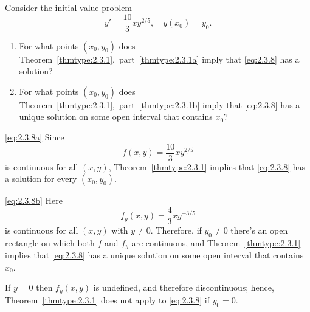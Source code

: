 \documentclass{ximera}
\begin{document}
\begin{example}\label{example:2.3.5}
Consider the initial value problem
\begin{equation} \label{eq:2.3.8}
y' = \frac{10}{3}xy^{2/5}, \quad y(x_0) = y_0.
\end{equation}
\begin{enumerate}
\item\label{eq:2.3.8a}
For what points $(x_0,y_0)$ does Theorem~\ref{thmtype:2.3.1},~part~\ref{thmtype:2.3.1a}
imply that
\eqref{eq:2.3.8} has a solution?

\item\label{eq:2.3.8b}
For what points $(x_0,y_0)$ does Theorem~\ref{thmtype:2.3.1},~part~\ref{thmtype:2.3.1b}
imply that
\eqref{eq:2.3.8} has a  unique solution on some open interval that contains
$x_0$?
\end{enumerate}

\begin{explanation}
\ref{eq:2.3.8a} Since
$$
f(x,y) = \frac{10}{3}xy^{2/5}
$$
is continuous for all $(x,y)$,  Theorem~\ref{thmtype:2.3.1}
implies that \eqref{eq:2.3.8} has a solution for every $(x_0,y_0)$.

\ref{eq:2.3.8b} Here
$$
f_y(x,y) = \frac{4}{3}xy^{-3/5}
$$
is continuous for all $(x,y)$ with $y\neq 0$. Therefore, if $y_0\neq0$
there's an open rectangle on which both $f$ and $f_y$ are
continuous, and Theorem~\ref{thmtype:2.3.1} implies that \eqref{eq:2.3.8} has
a unique solution on some open interval that contains $x_0$.

If $y=0$ then $f_y(x,y)$ is undefined, and therefore discontinuous;
hence, Theorem~\ref{thmtype:2.3.1} does not apply to \eqref{eq:2.3.8} if
$y_0=0$.
\end{explanation}
\end{example}
\end{document}
